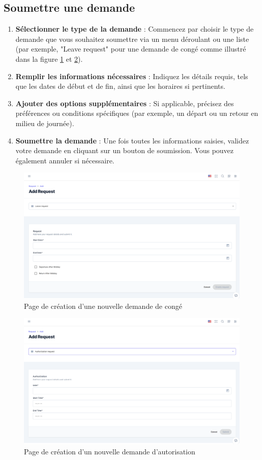 \subsection{Soumettre une demande}
\begin{enumerate}
    \item \textbf{Sélectionner le type de la demande} : Commencez par choisir le type de demande que vous souhaitez soumettre via un menu déroulant ou une liste (par exemple, "Leave request" pour une demande de congé comme illustré dans la figure \ref{fig:sund} et \ref{fig:sund2}).
    \item \textbf{Remplir les informations nécessaires} : Indiquez les détails requis, tels que les dates de début et de fin, ainsi que les horaires si pertinents.
    \item \textbf{Ajouter des options supplémentaires} : Si applicable, précisez des préférences ou conditions spécifiques (par exemple, un départ ou un retour en milieu de journée).
    \item \textbf{Soumettre la demande} : Une fois toutes les informations saisies, validez votre demande en cliquant sur un bouton de soumission. Vous pouvez également annuler si nécessaire.
\end{enumerate}
\begin{figure}[h]
    \centering
    \includegraphics[width=16cm]{images/realisation/addReq.png}
    \caption{Page de création d'une nouvelle demande de congé}
    \label{fig:sund}
\end{figure}
\newpage
\begin{figure}[h]
\vspace{-2.2cm}
    \centering
    \includegraphics[width=16cm]{images/realisation/addReq2.png}
    \caption{Page de création d'un nouvelle demande d'autorisation}
    \label{fig:sund2}
\end{figure}
